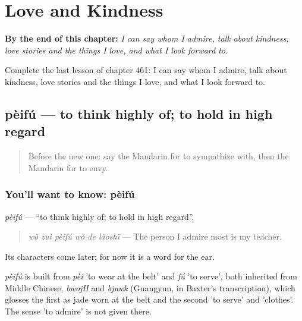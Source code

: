 
\chapter{Love and Kindness}
\label{ch:zh-love-and-kindness}

\begin{chapteropening}
\textbf{By the end of this chapter:} \emph{I can say whom I admire, talk about kindness, love stories and the things I love, and what I look forward to.}

Complete the last lesson of chapter 461: I can say whom I admire, talk about kindness, love stories and the things I love, and what I look forward to.
\end{chapteropening}

\section[pèifú]{pèifú — to think highly of; to hold in high regard}

\label{lesson:ZH-C461-peifu}



\begin{quote}
Before the new one: say the Mandarin for to sympathize with, then the Mandarin for to envy.
\end{quote}

\subsection*{You'll want to know: pèifú}
\emph{pèifú} — \textquotedblleft{}to think highly of; to hold in high regard\textquotedblright{}.

\begin{quote}
\emph{wǒ zuì pèifú wǒ de lǎoshī} — The person I admire most is my teacher.
\end{quote}

Its characters come later; for now it is a word for the ear.

\begin{cousinweb}
\emph{pèifú} is built from \emph{pèi} 'to wear at the belt' and \emph{fú} 'to serve', both inherited from Middle Chinese, \emph{bwojH} and \emph{bjuwk} (Guangyun, in Baxter's transcription), which glosses the first as jade worn at the belt and the second 'to serve' and 'clothes'. The sense 'to admire' is not given there.
\end{cousinweb}

